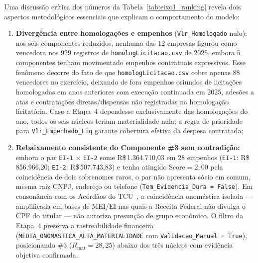 Uma discussão crítica dos números da Tabela~\ref{tab:eixo1_ranking} revela dois aspectos metodológicos essenciais que explicam o comportamento do modelo:
\begin{enumerate}
  \item \textbf{Divergência entre homologações e empenhos} (\texttt{Vlr\_\allowbreak Homologado} nulo): nos seis componentes reduzidos, nenhuma das 12 empresas figurou como vencedora nos 929 registros de \texttt{homolog\allowbreak Licitacao\allowbreak .csv} de 2025, embora 5 componentes tenham movimentado empenhos contratuais expressivos. Esse fenômeno decorre do fato de que \texttt{homolog\allowbreak Licitacao\allowbreak .csv} cobre apenas 88 vencedores no exercício, deixando de fora empenhos oriundos de licitações homologadas em anos anteriores com execução continuada em 2025, adesões a atas e contratações diretas/dispensas não registradas na homologação licitatória. Caso a Etapa~4 dependesse exclusivamente das homologações do ano, todos os seis núcleos teriam materialidade nula; a regra de prioridade para \texttt{Vlr\_\allowbreak Empenhado\_\allowbreak Liq} garante cobertura efetiva da despesa contratada;
  \item \textbf{Rebaixamento consistente do Componente \#3 sem contradição:} embora o par \texttt{EI-1} $\times$ \texttt{EI-2} some R\$\,1.364.710,03 em 28 empenhos (\texttt{EI-1}: R\$\,856.966,20; \texttt{EI-2}: R\$\,507.743,83) e tenha atingido $\text{Score}=2{,}00$ pela coincidência de dois sobrenomes raros, o par não apresenta sócio em comum, mesma raiz CNPJ, endereço ou telefone (\texttt{Tem\_\allowbreak Evidencia\_\allowbreak Dura = False}). Em consonância com os Acórdãos do TCU~\cite{tcu2011acordao2341,tcu2024acordao1798}, a coincidência onomástica isolada — amplificada em bases de MEI/EI nas quais a Receita Federal não divulga o CPF do titular — não autoriza presunção de grupo econômico. O filtro da Etapa~4 preserva a rastreabilidade financeira (\texttt{MEDIA\_\allowbreak ONOMASTICA\_\allowbreak ALTA\_\allowbreak MATERIALIDADE} com \texttt{Validacao\_\allowbreak Manual = True}), posicionando \#3 ($R_{\text{mat}}=28{,}25$) abaixo dos três núcleos com evidência objetiva confirmada.
\end{enumerate}

